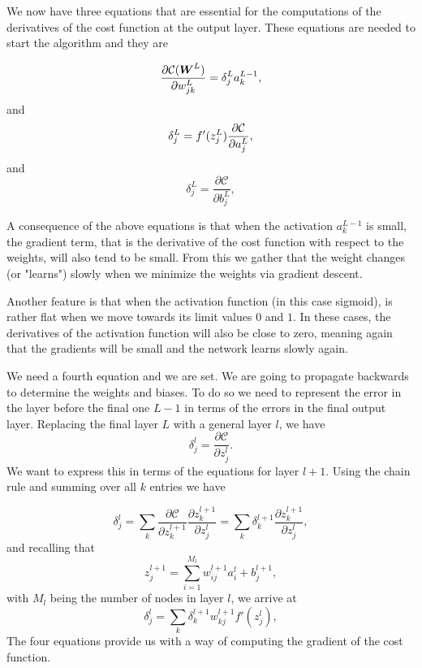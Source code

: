 We now have three equations that are essential for the computations of the derivatives of the cost function at the output layer.
These equations are needed to start the algorithm and they are

\begin{equation}
\frac{\partial\mathcal{C}({\boldsymbol{W}}^L)}{\partial w_{jk}^L}  =  \delta_j^La_k^{L-1},
\end{equation}
and
\begin{equation}
\delta_j^L = f'(z_j^L)\frac{\partial {\cal C}}{\partial a_j^L},
\end{equation}
and
\begin{equation}
\delta_j^L = \frac{\partial\mathcal{C}}{\partial b_j^L},
\end{equation}

\noindent A consequence of the above equations is that when the
activation $a_k^{L-1}$ is small, the gradient term, that is the
derivative of the cost function with respect to the weights, will also
tend to be small. From this we gather that the weight changes (or "learns") slowly when we
minimize the weights via gradient descent. 

Another feature is that when the activation function (in this case sigmoid),
is rather flat when we move towards its limit values $0$ and $1$. In these
cases, the derivatives of the activation function will also be close
to zero, meaning again that the gradients will be small and the
network learns slowly again.

\noindent We need a fourth equation and we are set. We are going to propagate
backwards to determine the weights and biases. To do so we need to represent
the error in the layer before the final one $L-1$ in terms of the errors in the 
final output layer. Replacing the final layer $L$ with a general layer $l$, we have
$$\delta_j^l =\frac{\partial\mathcal{C}}{\partial z_j^l}.$$
We want to express this in terms of the equations for layer $l+1$.
Using the chain rule and summing over all $k$ entries we have

$$\delta_j^l =\sum_k \frac{\partial\mathcal{C}}{\partial z_k^{l+1}}\frac{\partial z_k^{l+1}}{\partial z_j^{l}}=\sum_k \delta_k^{l+1}\frac{\partial z_k^{l+1}}{\partial z_j^{l}},$$
and recalling that
$$z_j^{l+1} = \sum_{i=1}^{M_{l}}w_{ij}^{l+1}a_i^{l}+b_j^{l+1},$$
with $M_l$ being the number of nodes in layer $l$, we arrive at
\begin{equation}\label{eq:backprop-general}
	\delta_j^l =\sum_k \delta_k^{l+1}w_{kj}^{l+1}f'(z_j^l),
\end{equation}
The four equations provide us with a way of computing the gradient of the cost function.

